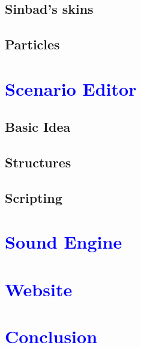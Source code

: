 \documentclass[article]{report}         %
\begin{document}
      \section{Sinbad's skins}
      \section{Particles}
    \chapter{\textcolor{blue}{Scenario Editor}}
      \section{Basic Idea}
      \section{Structures}
      \section{Scripting}
    \chapter{\textcolor{blue}{Sound Engine}}
    \chapter{\textcolor{blue}{Website}}
    \chapter{\textcolor{blue}{Conclusion}}
    
\end{document}
